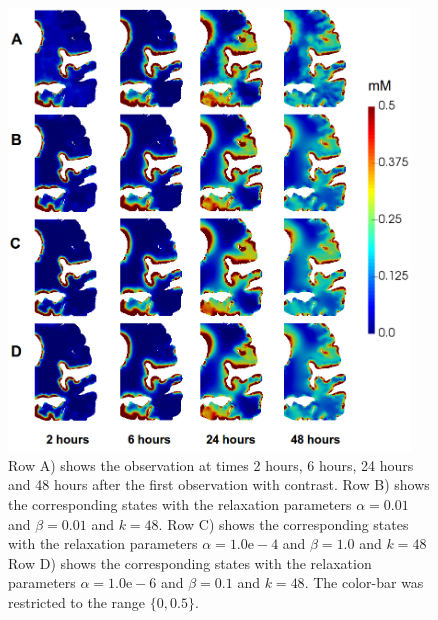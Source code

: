 \documentclass[12pt,a4paper]{article}
\begin{document}
%



 


\clearpage
 
\begin{figure}
\centering
\includegraphics[width=0.95\textwidth]{../different.png} 
\caption{Row A) shows the observation at times 2 hours, 6 hours, 24 hours and 48 hours after the first observation with contrast. Row B) shows the corresponding states with the relaxation parameters $\alpha=0.01$ and $\beta=0.01$ and $k=48$.   Row C) shows the corresponding states with the relaxation parameters $\alpha=1.0\mathrm{e-4}$ and $\beta=1.0$ and $k=48$
 Row D) shows the corresponding states with the relaxation parameters $\alpha=1.0\mathrm{e-6}$ and $\beta=0.1$ and $k=48$. The color-bar was restricted to the range $ \lbrace 0 ,0.5 \rbrace$. }
\label{Fig::realdata}
\end{figure}
\end{document}
